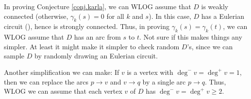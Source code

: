 \documentclass[numbers=enddot,12pt,final,onecolumn,notitlepage]{scrartcl}%
\theoremstyle{definition}
\newenvironment{proof}[1][Proof]{\noindent\textbf{#1.} }{\ \rule{0.5em}{0.5em}}
\newenvironment{noncompile}{}{}
\theoremstyle{plainsl}
\begin{document}
\begin{comment}
\begin{proof}
$\Longrightarrow$: Assume that $B$ is an $s$-convergence. Thus, $s$ is a to-root of $D\left\langle B\right\rangle $.
If there was an arc of $D\left\langle B\right\rangle $ with source $s$, then we could extend this arc to a cycle... and so $B$ would not be acyclic... So $s$ is a sink of $D\left\langle B\right\rangle $.
Furthermore, no vertex $v \neq s$ can be a sink of $D\left\langle B\right\rangle $, since $D\left\langle B\right\rangle $ must have a path from $v$ to $s$ (because $s$ is a to-root of $D\left\langle B\right\rangle $). So we conclude that $s$ is the only sink of $D\left\langle B\right\rangle $.
\medskip
$\Longleftarrow$: Assume that $s$ is the only sink of $D\left\langle B\right\rangle $.
Then, we can start at any vertex $v$ and keep wandering along arcs in $B$, we eventually get stuck at a sink (since the acyclicity of $B$ prevents us from revisiting a vertex), and this sink must be $s$ (since $s$ is the only sink of $D\left\langle B\right\rangle $). Thus, there is a path from $v$ to $s$ (it is a path, since we could not revisit any vertices). So ...
\end{proof}
\end{comment}


\begin{noncompile}
In proving Conjecture \ref{conj.karla}, we can WLOG assume that $D$ is weakly
connected (otherwise, $\gamma_{k}\left(  s\right)  =0$ for all $k$ and $s$).
In this case, $D$ has a Eulerian circuit (\cite[Theorem 4.7.2]{22s}), hence is
strongly connected. Thus, in proving $\gamma_{k}\left(  s\right)  =\gamma
_{k}\left(  t\right)  $, we can WLOG assume that $D$ has an arc from $s$ to
$t$. Not sure if this makes things any simpler. At least it might make it
simpler to check random $D$'s, since we can sample $D$ by randomly drawing an
Eulerian circuit.

Another simplification we can make: If $v$ is a vertex with $\deg^{-}%
v=\deg^{+}v=1$, then we can replace the arcs $p\rightarrow v$ and
$v\rightarrow q$ by a single arc $p\rightarrow q$. Thus, WLOG we can assume
that each vertex $v$ of $D$ has $\deg^{-}v=\deg^{+}v\geq2$.
\end{noncompile}
\end{document}
